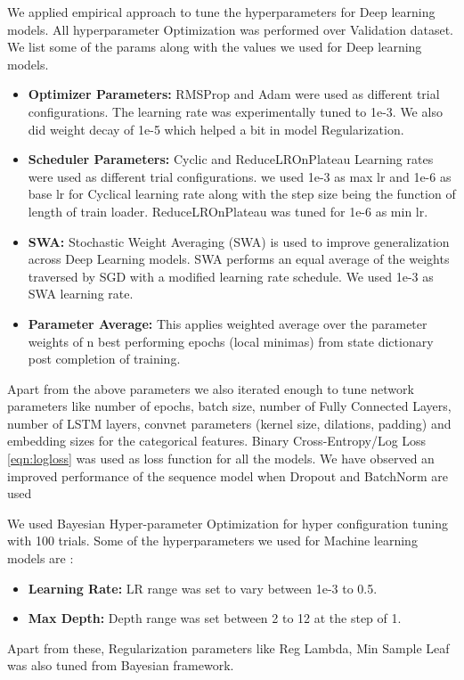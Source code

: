 We applied empirical approach to tune the hyperparameters for Deep learning models. All hyperparameter Optimization
was performed over Validation dataset. We list some of the params along with the values we used for Deep learning models.
  \begin{itemize}
    \item {\bf Optimizer Parameters:} RMSProp \cite{bengio2015rmsprop} and Adam were used as different trial configurations. The learning rate 
    was experimentally tuned to 1e-3. We also did weight decay of 1e-5 which helped a bit in model Regularization.
    \item {\bf Scheduler Parameters:} Cyclic \cite{smith2017cyclical} and ReduceLROnPlateau \cite{zaheer2018adaptive} 
    Learning rates were used as different trial configurations.
    we used 1e-3 as max lr and 1e-6 as base lr for Cyclical learning rate along with the step size being the function of
    length of train loader. ReduceLROnPlateau was tuned for 1e-6 as min lr.
    \item {\bf SWA:} Stochastic Weight Averaging (SWA) \cite{izmailov2018averaging} is used to improve generalization across Deep Learning
    models. SWA performs an equal average of the weights traversed by SGD with a modified learning rate schedule. We used 
    1e-3 as SWA learning rate.
    \item {\bf Parameter Average:} This applies weighted average over the parameter weights of n best performing epochs 
    (local minimas) from state dictionary post completion of training.
  \end{itemize}
Apart from the above parameters we also iterated enough to tune network parameters like number of epochs, batch size, 
number of Fully Connected Layers, number of LSTM layers, convnet parameters (kernel size, dilations, padding)
and embedding sizes for the categorical features. Binary Cross-Entropy/Log Loss \ref{eqn:logloss} was used as loss 
function for all the models. We have observed an improved performance of the sequence model \cite{sutskever2014sequence} 
when Dropout \cite{hinton2012improving}  and BatchNorm \cite{santurkar2018does}  are used

We used Bayesian Hyper-parameter Optimization \cite{bergstra2013hyperopt} for hyper configuration tuning with 100 trials.
Some of the hyperparameters we used for Machine learning models are :
  \begin{itemize}
    \item {\bf Learning Rate:} LR range was set to vary between 1e-3 to 0.5. 
    \item {\bf Max Depth:} Depth range was set between 2 to 12 at the step of 1.
  \end{itemize}
Apart from these, Regularization parameters like Reg Lambda, Min Sample Leaf was also tuned from Bayesian framework.

